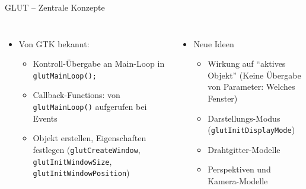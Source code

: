 \begin{frame}{GLUT -- Zentrale Konzepte}
%
\begin{columns}[T]
\begin{itemize}
\item Von GTK bekannt:
	\begin{itemize}
	\item Kontroll-Übergabe an Main-Loop in \texttt{glutMainLoop();} \vspace{3pt}
	\item Callback-Functions: von \texttt{glutMainLoop()} aufgerufen bei Events \vspace{3pt}
	\item Objekt erstellen, Eigenschaften festlegen \newline
		(\texttt{glutCreateWindow}, \texttt{glutInitWindowSize}, \texttt{glutInitWindowPosition})
	\end{itemize}
\end{itemize}
%
\begin{itemize}
\item Neue Ideen
	\begin{itemize}
	\item Wirkung auf \enquote{aktives Objekt}\newline
		(Keine Übergabe von Parameter: Welches Fenster) \vspace{3pt}
	\item Darstellungs-Modus (\texttt{glutInitDisplayMode}) \vspace{3pt}
	\item Drahtgitter-Modelle \vspace{3pt}
	\item Perspektiven und Kamera-Modelle
	\end{itemize}
\end{itemize}
\end{columns}
%
\end{frame}


